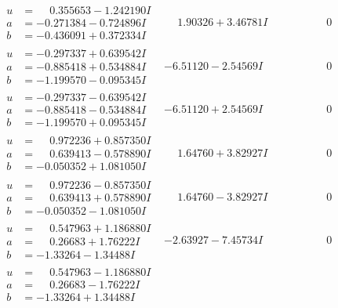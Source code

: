 \documentclass[1p]{elsarticle_modified}
\theoremstyle{definition}
\begin{document}
$$\begin{array}{c|c|c}
\begin{aligned}
u &= \phantom{-}0.355653 - 1.242190 I \\
a &= -0.271384 - 0.724896 I \\
b &= -0.436091 + 0.372334 I\end{aligned}
 & \phantom{-}1.90326 + 3.46781 I & \phantom{-0.000000 } 0 \\ \hline\begin{aligned}
u &= -0.297337 + 0.639542 I \\
a &= -0.885418 + 0.534884 I \\
b &= -1.199570 - 0.095345 I\end{aligned}
 & -6.51120 - 2.54569 I & \phantom{-0.000000 } 0 \\ \hline\begin{aligned}
u &= -0.297337 - 0.639542 I \\
a &= -0.885418 - 0.534884 I \\
b &= -1.199570 + 0.095345 I\end{aligned}
 & -6.51120 + 2.54569 I & \phantom{-0.000000 } 0 \\ \hline\begin{aligned}
u &= \phantom{-}0.972236 + 0.857350 I \\
a &= \phantom{-}0.639413 - 0.578890 I \\
b &= -0.050352 + 1.081050 I\end{aligned}
 & \phantom{-}1.64760 + 3.82927 I & \phantom{-0.000000 } 0 \\ \hline\begin{aligned}
u &= \phantom{-}0.972236 - 0.857350 I \\
a &= \phantom{-}0.639413 + 0.578890 I \\
b &= -0.050352 - 1.081050 I\end{aligned}
 & \phantom{-}1.64760 - 3.82927 I & \phantom{-0.000000 } 0 \\ \hline\begin{aligned}
u &= \phantom{-}0.547963 + 1.186880 I \\
a &= \phantom{-}0.26683 + 1.76222 I \\
b &= -1.33264 - 1.34488 I\end{aligned}
 & -2.63927 - 7.45734 I & \phantom{-0.000000 } 0 \\ \hline\begin{aligned}
u &= \phantom{-}0.547963 - 1.186880 I \\
a &= \phantom{-}0.26683 - 1.76222 I \\
b &= -1.33264 + 1.34488 I\end{aligned}

\end{array}$$
\end{document}
